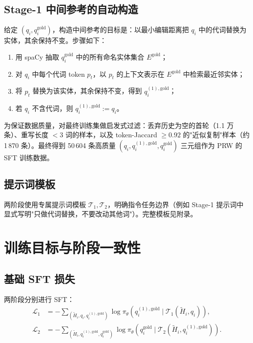 \subsection{Stage-1 中间参考的自动构造}

给定 $(q_i, q_i^{\text{gold}})$，构造中间参考的目标是：以最小编辑距离把 $q_i$ 中的代词替换为实体，其余保持不变。步骤如下：

\begin{enumerate}
    \item 用 spaCy 抽取 $q_i^{\text{gold}}$ 中的所有命名实体集合 $E^{\text{gold}}$；
    \item 对 $q_i$ 中每个代词 token $p_t$，以 $p_t$ 的上下文表示在 $E^{\text{gold}}$ 中检索最近邻实体；
    \item 将 $p_t$ 替换为该实体，其余保持不变，得到 $q_i^{(1),\text{gold}}$；
    \item 若 $q_i$ 不含代词，则 $q_i^{(1),\text{gold}} := q_i$。
\end{enumerate}

为保证数据质量，对最终训练集做启发式过滤：丢弃历史为空的首轮（1.1 万条）、重写长度 $<3$ 词的样本，以及 token-Jaccard $\ge 0.92$ 的"近似复制"样本（约 1\,870 条）。最终得到 50\,604 条高质量 $(q_i, q_i^{(1),\text{gold}}, q_i^{\text{gold}})$ 三元组作为 PRW 的 SFT 训练数据。

\subsection{提示词模板}

两阶段使用专属提示词模板 $\mathcal{T}_1, \mathcal{T}_2$，明确指令任务边界（例如 Stage-1 提示词中显式写明"只做代词替换，不要改动其他词"）。完整模板见附录。

\section{训练目标与阶段一致性}
\label{sec:prw_loss}

\subsection{基础 SFT 损失}

两阶段分别进行 SFT：
\begin{align}
\mathcal{L}_1 &= -\sum_{(\tilde H_i, q_i, q_i^{(1),\text{gold}})}\log \pi_\theta(q_i^{(1),\text{gold}} \mid \mathcal{T}_1(\tilde H_i, q_i)), \\
\mathcal{L}_2 &= -\sum_{(\tilde H_i, q_i^{(1),\text{gold}}, q_i^{\text{gold}})}\log \pi_\theta(q_i^{\text{gold}} \mid \mathcal{T}_2(\tilde H_i, q_i^{(1),\text{gold}})).
\end{align}


